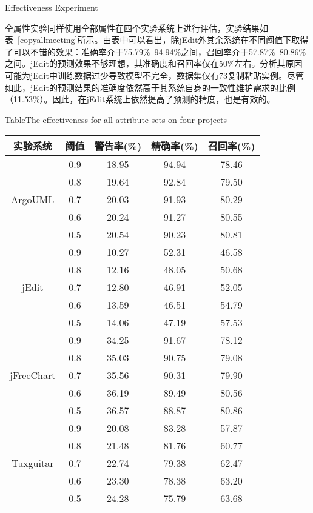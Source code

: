 {Effectiveness Experiment}

全属性实验同样使用全部属性在四个实验系统上进行评估，实验结果如表~\ref{copyallmeeting}所示。由表中可以看出，除jEdit外其余系统在不同阈值下取得了可以不错的效果：准确率介于75.79\%--94.94\%之间，召回率介于57.87\%~80.86\%之间。jEdit的预测效果不够理想，其准确度和召回率仅在50\%左右。分析其原因可能为jEdit中训练数据过少导致模型不完全，数据集仅有73复制粘贴实例。尽管如此，jEdit的预测结果的准确度依然高于其系统自身的一致性维护需求的比例（11.53\%）。因此，在jEdit系统上依然提高了预测的精度，也是有效的。

\begin{table}[htbp]
{Table$\!$}{The effectiveness for all attribute sets on four projects}
\vspace{0.5em}
\centering
\wuhao
\begin{tabular}{ccccc}
\toprule[1.5pt]
{实验系统}&{阈值}&{警告率(\%)}&{精确率(\%)}&{召回率(\%)}\\
\midrule[1pt]
\multirow{5}{*}{ArgoUML}
&0.9&	18.95&	94.94&	78.46\\
&0.8&	19.64&	92.84&	79.50\\
&0.7&	20.03&	91.93&	80.29\\
&0.6&	20.24&	91.27&	80.55\\
&0.5&	20.54&	90.23&	80.81\\
\hline
\multirow{5}{*}{jEdit}
&0.9&	10.27&	52.31&	46.58\\
&0.8&	12.16&	48.05&	50.68\\
&0.7&	12.80&	46.91&	52.05\\
&0.6&	13.59&	46.51&	54.79\\
&0.5&	14.06&	47.19&	57.53\\
\hline
\multirow{5}{*}{jFreeChart}
&0.9&	34.25&	91.67&	78.12\\
&0.8&	35.03&	90.75&	79.08\\
&0.7&	35.56&	90.31&	79.90\\
&0.6&	36.19&	89.49&	80.56\\
&0.5&	36.57&	88.87&	80.86\\
\hline
\multirow{5}{*}{Tuxguitar}
&0.9&	20.08&	83.28&	57.87\\
&0.8&	21.48&	81.76&	60.77\\
&0.7&	22.74&	79.38&	62.47\\
&0.6&	23.30&	78.38&	63.20\\
&0.5&	24.28&	75.79&	63.68\\
\bottomrule[1.5pt]
\end{tabular}
\end{table}

